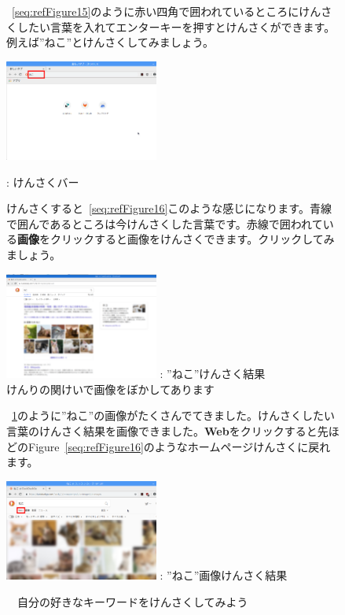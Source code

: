 \documentclass[a4paper,12pt]{jarticle}
\begin{document}
\begin{figure}
  ~\ref{seq:refFigure15}のように赤い四角で囲われているところにけんさくしたい言葉を入れてエンターキーを押すとけんさくができます。例えば”ねこ”とけんさくしてみましょう。
  \centering
  {\upshape
    \includegraphics[width=0.45\textwidth]{textbook-img077.png}

    {\theFigure\label{seq:refFigure15}}: けんさくバー}


  \flushleft
  けんさくすると~\ref{seq:refFigure16}このような感じになります。青線で囲んであるところは今けんさくした言葉です。赤線で囲われている\textbf{画像}をクリックすると画像をけんさくできます。クリックしてみましょう。


  \centering
  {\upshape
    \includegraphics[width=0.45\textwidth]{textbook-img078.png}
    \newline
    {\theFigure\label{seq:refFigure16}}:
    ”ねこ”けんさく結果\\
    けんりの関けいで画像をぼかしてあります}

  \flushleft
  ~\ref{seq:refFigure17}のように”ねこ”の画像がたくさんでてきました。けんさくしたい言葉のけんさく結果を画像できました。\textbf{Web}をクリックすると先ほどのFigure~\ref{seq:refFigure16}のようなホームページけんさくに戻れます。


  \centering
  \upshape
    \includegraphics[width=0.45\textwidth]{textbook-img079.png}
    \newline
    {\theFigure\label{seq:refFigure17}}:
    ”ねこ”画像けんさく結果

  \flushleft
  \theQuestion

  \ \ 自分の好きなキーワードをけんさくしてみよう

\end{figure}
\end{document}
